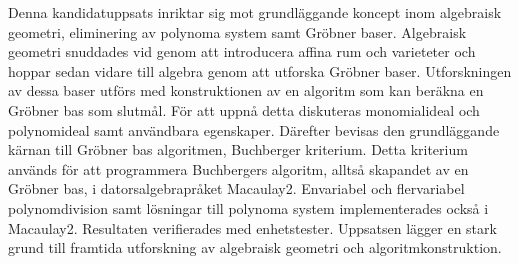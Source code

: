 Denna kandidatuppsats inriktar sig mot grundläggande koncept inom algebraisk geometri, eliminering av polynoma system samt Gröbner baser. Algebraisk geometri snuddades vid genom att introducera affina rum och varieteter och hoppar sedan vidare till algebra genom att utforska Gröbner baser. Utforskningen av dessa baser utförs med konstruktionen av en algoritm som kan beräkna en Gröbner bas som slutmål. För att uppnå detta diskuteras monomialideal och polynomideal samt användbara egenskaper. Därefter bevisas den grundläggande kärnan till Gröbner bas algoritmen, Buchberger kriterium. Detta kriterium används för att programmera Buchbergers algoritm, alltså skapandet av en Gröbner bas, i datorsalgebrapråket Macaulay2. Envariabel och flervariabel polynomdivision samt lösningar till polynoma system implementerades också i Macaulay2. Resultaten verifierades med enhetstester. Uppsatsen lägger en stark grund till framtida utforskning av algebraisk geometri och algoritmkonstruktion.   